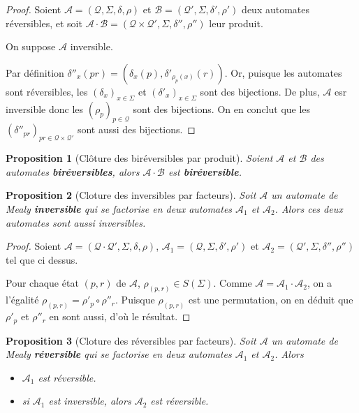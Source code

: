 \documentclass{article}
\newtheorem{prop}{Proposition}
\begin{document}
\begin{proof}
  Soient $\mathcal{A}=\left(\mathcal{Q}, \Sigma, \delta, \rho\right)$ et $\mathcal{B}=\left(\mathcal{Q'}, \Sigma, \delta', \rho'\right)$ deux automates réversibles, et soit $\mathcal{A\cdot B}=\left(\mathcal{Q\times Q'}, \Sigma, \delta'', \rho''\right)$ leur produit.


  On suppose $\mathcal{A}$ inversible.


  Par définition $\delta''_x(pr)=(\delta_x(p), \delta'_{\rho_p(x)}(r))$. Or, puisque les automates sont réversibles, les $(\delta_x)_{x\in\Sigma}$ et $(\delta'_x)_{x\in\Sigma}$ sont des bijections. De plus, $\mathcal{A}$ esr inversible donc les $(\rho_p)_{p\in \mathcal{Q}}$ sont des bijections. On en conclut que les $(\delta''_{pr})_{pr\in\mathcal{Q}\times\mathcal{Q'}}$ sont aussi des bijections.
\end{proof}

\begin{prop}[Clôture des biréversibles par produit]
  Soient $\mathcal{A}$ et $\mathcal{B}$ des automates \textbf{biréversibles}, alors $\mathcal{A}\cdot\mathcal{B}$ est \textbf{biréversible}.
\end{prop}

\begin{prop}[Cloture des inversibles par facteurs]
  Soit $\mathcal{A}$ un automate de Mealy \textbf{inversible} qui se factorise en deux automates $\mathcal{A}_1$ et $\mathcal{A}_2$. Alors ces deux automates sont aussi inversibles.
\end{prop}

\begin{proof}
  Soient $\mathcal{A}=\left(\mathcal{Q\cdot Q'}, \Sigma, \delta, \rho\right)$, $\mathcal{A}_1=\left(\mathcal{Q}, \Sigma, \delta', \rho'\right)$ et $\mathcal{A}_2=\left(\mathcal{Q'}, \Sigma, \delta'', \rho''\right)$ tel que ci dessus.

  Pour chaque état $(p, r)$ de $\mathcal{A}$, $\rho_{(p, r)}\in S(\Sigma)$. Comme $\mathcal{A}=\mathcal{A}_1\cdot\mathcal{A}_2$, on a l'égalité $\rho_{(p, r)}=\rho'_p\circ\rho''_r$. Puisque $\rho_{(p, r)}$ est une permutation, on en déduit que $\rho'_p$ et $\rho''_r$ en sont aussi, d'où le résultat.
\end{proof}

\begin{prop}[Cloture des réversibles par facteurs]
  Soit $\mathcal{A}$ un automate de Mealy \textbf{réversible} qui se factorise en deux automates $\mathcal{A}_1$ et $\mathcal{A}_2$. Alors
  \begin{itemize}
  \item $\mathcal{A}_1$ est réversible.
  \item si $\mathcal{A}_1$ est inversible, alors $\mathcal{A}_2$ est réversible.
  \end{itemize}
\end{prop}
\end{document}
